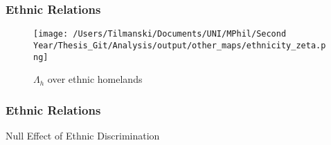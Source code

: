 \documentclass[]{beamer}   	%
\begin{document}
\begin{frame}
\begin{table}[!t]
{}

\end{table}

\end{frame}


\begin{frame}
\frametitle{Ethnic Relations}
\begin{figure}
\centering
\texttt{[image: /Users/Tilmanski/Documents/UNI/MPhil/Second Year/Thesis\_Git/Analysis/output/other\_maps/ethnicity\_zeta.png]}
\caption{$\Lambda_{h}$ over ethnic homelands}
\label{fig:ethnicities}
\end{figure}
\end{frame}

\begin{frame}
\frametitle{Ethnic Relations}
\begin{table}[t] \centering
  \caption{Null Effect of Ethnic Discrimination}
  \label{tab:Ethn_discrimination}
  \resizebox{\textwidth}{!}{


}
\end{table}
\end{frame}
\end{document}
